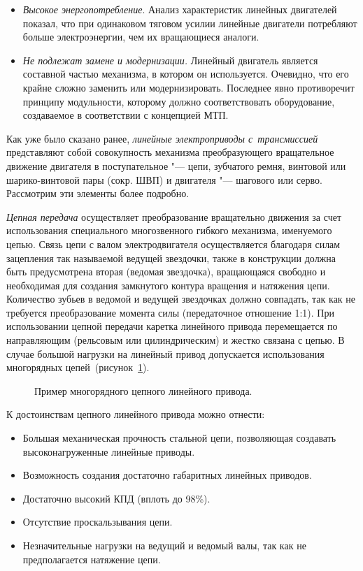 \begin{itemize}
	\item \textit{Высокое энергопотребление}. Анализ характеристик линейных двигателей показал, что при одинаковом тяговом усилии линейные двигатели потребляют больше электроэнергии, чем их вращающиеся аналоги.
	
	\item \textit{Не подлежат замене и модернизации.} Линейный двигатель является составной частью механизма, в котором он используется. Очевидно, что его крайне сложно заменить или модернизировать. Последнее явно противоречит принципу модульности, которому должно соответствовать оборудование, создаваемое в соответствии с концепцией МТП.
\end{itemize}

Как уже было сказано ранее, \textit{линейные электроприводы с~трансмиссией} представляют собой совокупность механизма преобразующего вращательное движение двигателя в поступательное "--- цепи, зубчатого ремня, винтовой или шарико-винтовой пары (сокр. ШВП) и двигателя "--- шагового или серво. Рассмотрим эти элементы более подробно.

\textit{Цепная передача} осуществляет преобразование вращательно движения за счет использования специального многозвенного гибкого механизма, именуемого цепью. Связь цепи с валом электродвигателя осуществляется благодаря силам зацепления так называемой ведущей звездочки, также в конструкции должна быть предусмотрена вторая (ведомая звездочка), вращающаяся свободно и необходимая для создания замкнутого контура вращения и натяжения цепи. Количество зубьев в ведомой и ведущей звездочках должно совпадать, так как не требуется преобразование момента силы (передаточное отношение 1:1). При использовании цепной передачи каретка линейного привода перемещается по направляющим (рельсовым или цилиндрическим) и жестко связана с цепью. В случае большой нагрузки на линейный привод допускается использования многорядных цепей~(рисунок~\cref{fig:chain}).

\begin{figure}[ht]
	\caption{Пример многорядного цепного линейного привода.}\label{fig:chain}
\end{figure}

К достоинствам цепного линейного привода можно отнести:

\begin{itemize}
	\item Большая механическая прочность стальной цепи, позволяющая создавать высоконагруженные линейные приводы.
	
	\item Возможность создания достаточно габаритных линейных приводов.
	
	\item Достаточно высокий КПД (вплоть до 98\%).
	
	\item Отсутствие проскальзывания цепи.
	
	\item Незначительные нагрузки на ведущий и ведомый валы, так как не предполагается натяжение цепи.
\end{itemize}

